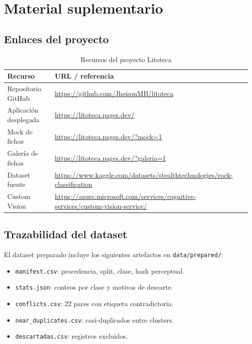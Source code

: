 \chapter{Material suplementario}
\label{app:supplementary}

\section{Enlaces del proyecto}

\begin{table}[H]
  \centering
  \caption{Recursos del proyecto Litoteca}
  \label{tab:recursos}
  \begin{tabular}{@{}p{4.2cm}p{8.2cm}@{}}
    \toprule
    Recurso & URL / referencia \\
    \midrule
    Repositorio GitHub & \url{https://github.com/JheisonMB/litoteca} \\
    Aplicación desplegada & \url{https://litoteca.pages.dev/} \\
    Mock de fichas & \url{https://litoteca.pages.dev/?mock=1} \\
    Galería de fichas & \url{https://litoteca.pages.dev/?galeria=1} \\
    Dataset fuente & \url{https://www.kaggle.com/datasets/stealthtechnologies/rock-classification} \\
    Custom Vision & \url{https://azure.microsoft.com/services/cognitive-services/custom-vision-service/} \\
    \bottomrule
  \end{tabular}
\end{table}

\section{Trazabilidad del dataset}

El dataset preparado incluye los siguientes artefactos en \texttt{data/prepared/}:

\begin{itemize}
  \item \texttt{manifest.csv}: procedencia, split, clase, hash perceptual.
  \item \texttt{stats.json}: conteos por clase y motivos de descarte.
  \item \texttt{conflicts.csv}: 22 pares con etiqueta contradictoria.
  \item \texttt{near\_duplicates.csv}: casi-duplicados entre clusters.
  \item \texttt{descartadas.csv}: registros excluidos.
\end{itemize}

